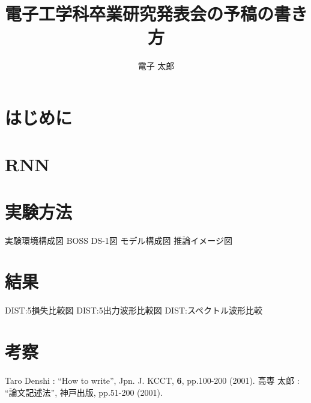 \documentclass{jarticle}
\title{電子工学科卒業研究発表会の予稿の書き方} %
\author{電子 太郎}%
\begin{document}
%
\maketitle %

\section{はじめに}%

\section{RNN}

\section{実験方法}
実験環境構成図
BOSS DS-1図
モデル構成図
推論イメージ図

\section{結果}
DIST:5損失比較図
DIST:5出力波形比較図
DIST:スペクトル波形比較

\section{考察}

\begin{thebibliography}{99}%
Taro Denshi : ``How to write'', Jpn. J. KCCT,
 \textbf{6}, pp.100-200 (2001).
高専 太郎 : ``論文記述法'', 神戸出版, pp.51-200 (2001).
\end{thebibliography}
\end{document}
